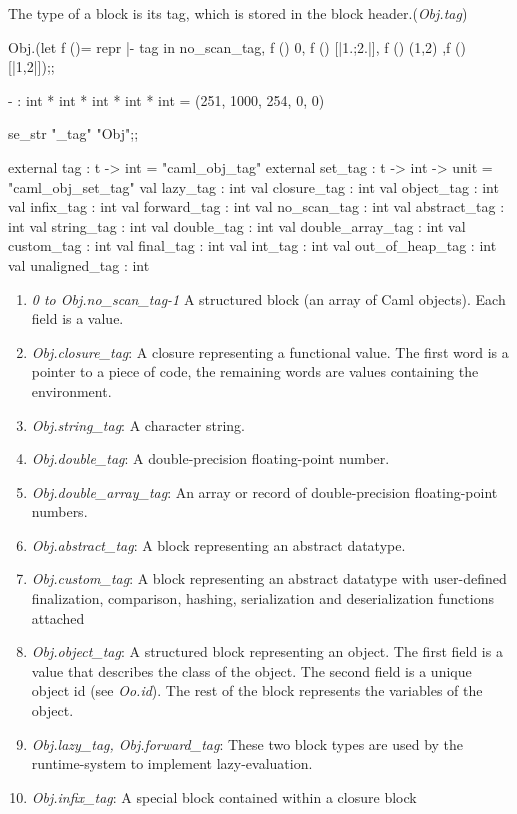 \begin{enumerate}
  The type of a block is its tag, which is stored in the block header.(\textit{Obj.tag})

  \begin{redcode}
Obj.(let f ()= repr |- tag in no_scan_tag, f () 0, f () [|1.;2.|], f
() (1,2) ,f ()[|1,2|]);;
\end{redcode}

\begin{bluecode}
- : int * int * int * int * int = (251, 1000, 254, 0, 0)    
\end{bluecode}

\begin{redcode}
se_str "_tag" "Obj";;  
\end{redcode}

\begin{bluecode}
    external tag : t -> int = "caml_obj_tag"
    external set_tag : t -> int -> unit = "caml_obj_set_tag"
    val lazy_tag : int
    val closure_tag : int
    val object_tag : int
    val infix_tag : int
    val forward_tag : int
    val no_scan_tag : int
    val abstract_tag : int
    val string_tag : int
    val double_tag : int
    val double_array_tag : int
    val custom_tag : int
    val final_tag : int
    val int_tag : int
    val out_of_heap_tag : int
    val unaligned_tag : int  
\end{bluecode}

\begin{enumerate}

\item \textit{0 to Obj.no\_scan\_tag-1} 
  A structured block (an array of Caml objects). Each field is a value.
\item \textit{Obj.closure\_tag}: A closure representing a functional value. The
first word is a pointer to a piece of code, the remaining words are
values containing the environment.
\item \textit{Obj.string\_tag}: A character string.
\item \textit{Obj.double\_tag}: A double-precision floating-point number.
\item \textit{Obj.double\_array\_tag}: An array or record of double-precision
floating-point numbers.
\item \textit{Obj.abstract\_tag}: A block representing an abstract datatype.
\item \textit{Obj.custom\_tag}: A block representing an abstract datatype with
  user-defined finalization, comparison, hashing, serialization and
  deserialization functions attached
\item \textit{Obj.object\_tag}: A structured block representing an object. The first
  field is a value that describes the class of the object. The second
  field is a unique object id (see \textit{Oo.id}). The rest of the block
  represents the variables of the object.
\item \textit{Obj.lazy\_tag, Obj.forward\_tag}: These two block types
  are used by the runtime-system to implement lazy-evaluation.
\item \textit{Obj.infix\_tag}: A special block contained within a
  closure block  
\end{enumerate}


\end{enumerate}
